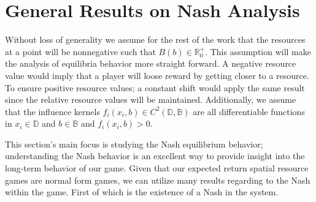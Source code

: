 \documentclass{article}
\newcommand {\R}{\mathbb{R}}
\newcommand {\D}{\mathbb{D}}
\newcommand {\B}{\mathbb{B}}
\begin{document}
    \section{General Results on Nash Analysis}
         Without loss of generality we assume for the rest of the work that the resources at a point will be nonnegative such that $B(b)\in \R^+_0$. This assumption will make the analysis of equilibria behavior more straight forward. A negative resource value would imply that a player will loose reward by getting closer to a resource. To ensure positive resource values; a constant shift would apply the same result since the relative resource values will be maintained. Additionally, we assume that the influence kernels $f_i(x_i,b)\in C^2(\D,\B)$ are all differentiable functions in $x_i\in \D$ and $b\in \B$ and $f_i(x_i,b)>0$. 
    
        This section's main focus is studying the Nash equilibrium behavior; understanding the Nash behavior is an excellent way to provide insight into the long-term behavior of our game. Given that our expected return spatial resource games are normal form games, we can utilize many results regarding to the Nash within the game. First of which is the existence of a Nash in the system.
        
\end{document}
